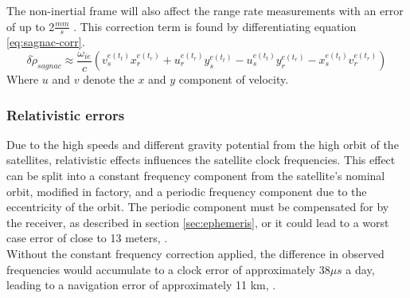 The non-inertial frame will also affect the range rate measurements with an error of up to 2$\frac{mm}{s}$ \cite{groves2013principles}. This correction term is found by differentiating equation \ref{eq:sagnac-corr}.
\begin{equation}
    \delta\dot{\rho}_{sagnac} \approx \frac{\omega_{ie}}{c}(v^{e(t_t)}_{s}x^{e(t_r)}_{r} + u^{e(t_r)}_{r}y^{e(t_t)}_{s}-u^{e(t_t)}_{s}y^{e(t_r)}_{r}-x^{e(t_t)}_{s}v^{e(t_r)}_{r})
\end{equation}
Where $u$ and $v$ denote the $x$ and $y$ component of velocity.

\subsubsection{Relativistic errors} 
Due to the high speeds and different gravity potential from the high orbit of the satellites, relativistic effects influences the satellite clock frequencies. This effect can be split into a constant frequency component from the satellite's nominal orbit, modified in factory, and a periodic frequency component due to the eccentricity of the orbit. The periodic component must be compensated for by the receiver, as described in section \ref{sec:ephemeris}, or it could lead to a worst case error of close to 13 meters, \cite{misra2006global}.\\

Without the constant frequency correction applied, the difference in observed frequencies would accumulate to a clock error of approximately $38 \mu s$ a day, leading to a navigation error of approximately 11 km, \cite{pascual2007introducing}.
